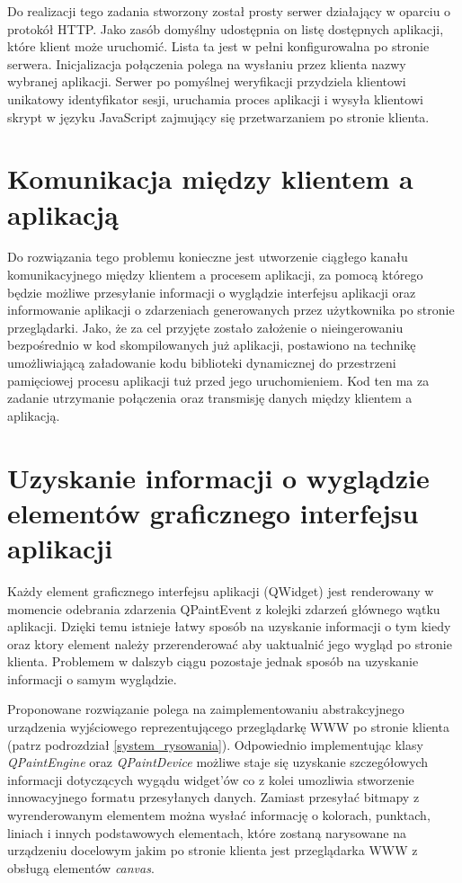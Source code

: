 \documentclass[polish]{inz}
\begin{document}
Do realizacji tego zadania stworzony został prosty serwer działający w oparciu o protokół HTTP. Jako zasób domyślny udostępnia on listę dostępnych aplikacji, które klient może uruchomić. Lista ta jest w pełni konfigurowalna po stronie serwera. Inicjalizacja połączenia polega na wysłaniu przez klienta nazwy wybranej aplikacji. Serwer po pomyślnej weryfikacji przydziela klientowi unikatowy identyfikator sesji, uruchamia proces aplikacji i wysyła klientowi skrypt w języku JavaScript zajmujący się przetwarzaniem po stronie klienta.

\section{Komunikacja między klientem a aplikacją}
Do rozwiązania tego problemu konieczne jest utworzenie ciągłego kanału komunikacyjnego między klientem a procesem aplikacji, za pomocą którego będzie możliwe przesyłanie informacji o wyglądzie interfejsu aplikacji oraz informowanie aplikacji o zdarzeniach generowanych przez użytkownika po stronie przeglądarki. Jako, że za cel przyjęte zostało założenie o nieingerowaniu bezpośrednio w kod skompilowanych już aplikacji, postawiono na technikę umożliwiającą załadowanie kodu biblioteki dynamicznej do przestrzeni pamięciowej procesu aplikacji tuż przed jego uruchomieniem. Kod ten ma za zadanie utrzymanie połączenia oraz transmisję danych między klientem a aplikacją.

\section{Uzyskanie informacji o wyglądzie elementów graficznego interfejsu aplikacji}
Każdy element graficznego interfejsu aplikacji (QWidget) jest renderowany w momencie odebrania zdarzenia QPaintEvent z kolejki zdarzeń głównego wątku aplikacji. Dzięki temu istnieje łatwy sposób na uzyskanie informacji o tym kiedy oraz ktory element należy przerenderować aby uaktualnić jego wygląd po stronie klienta. Problemem w dalszyb ciągu pozostaje jednak sposób na uzyskanie informacji o samym wyglądzie. 

Proponowane rozwiązanie polega na zaimplementowaniu abstrakcyjnego urządzenia wyjściowego reprezentującego przeglądarkę WWW po stronie klienta (patrz podrozdział \ref{system_rysowania}). Odpowiednio implementując klasy \emph{QPaintEngine} oraz \emph{QPaintDevice} możliwe staje się uzyskanie szczegółowych informacji dotyczących wygądu widget'ów co z kolei umozliwia stworzenie innowacyjnego formatu przesyłanych danych. Zamiast przesyłać bitmapy z wyrenderowanym elementem można wysłać informację o kolorach, punktach, liniach i innych podstawowych elementach, które zostaną narysowane na urządzeniu docelowym jakim po stronie klienta jest przeglądarka WWW z obsługą elementów \emph{canvas}.
\end{document}
